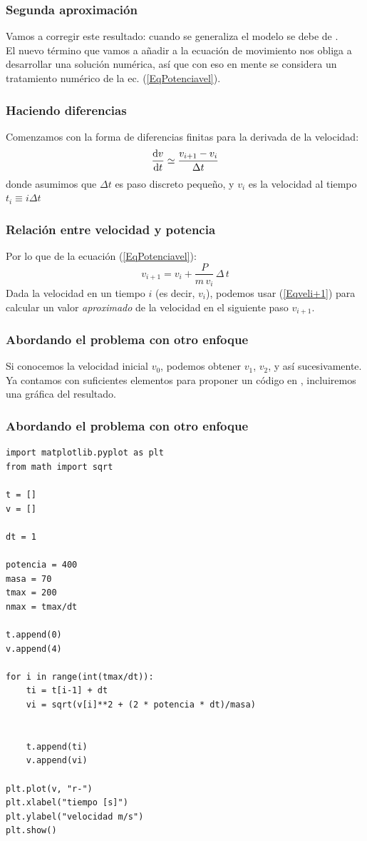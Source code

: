 \documentclass[12pt]{beamer}
\begin{document}
\begin{frame}
\frametitle{Segunda aproximación}
Vamos a corregir este resultado: cuando se generaliza el modelo se debe de .
\\
\bigskip
\pause
El nuevo término que vamos a añadir a la ecuación de movimiento nos obliga a desarrollar una solución numérica, así que con eso en mente se considera un tratamiento numérico de la ec. (\ref{EqPotenciavel}).
\end{frame}
\begin{frame}
\frametitle{Haciendo diferencias}
Comenzamos con la forma de diferencias finitas para la derivada de la velocidad:
\pause
\begin{equation}
\dv{v}{t} \simeq \dfrac{v_{i + 1} - v_{i}}{\Delta t}
\label{Eqderivada}
\end{equation}
donde asumimos que $\Delta t$ es paso discreto pequeño, y $v_{i}$ es la velocidad al tiempo $t_{i} \equiv i \Delta t$
\end{frame}
\begin{frame}
\frametitle{Relación entre velocidad y potencia}
Por lo que de la ecuación (\ref{EqPotenciavel}):
\pause
\begin{equation}
v_{i + 1} = v_{i} + \dfrac{P}{m \, v_{i}} \, \Delta \, t
\label{Eqveli+1}
\end{equation}
Dada la velocidad en un tiempo $i$ (es decir, $v_{i}$), podemos usar (\ref{Eqveli+1}) para calcular un valor \textit{aproximado} de la velocidad en el siguiente paso $v_{i+1}$.
\end{frame}
\begin{frame}
\frametitle{Abordando el problema con otro enfoque}
Si conocemos la velocidad inicial $v_{0}$, podemos obtener $v_{1}$, $v_{2}$, y así sucesivamente.
\\
\bigskip
\pause
Ya contamos con suficientes elementos para proponer un código en \python{}, incluiremos una gráfica del resultado.
\end{frame}
\begin{frame}
\frametitle{Abordando el problema con otro enfoque}
\begin{lstlisting}[basicstyle=\linespread{1.2}\ttfamily\small, columns=fullflexible,escapeinside=||]
import matplotlib.pyplot as plt
from math import sqrt

t = []
v = []

dt = 1

potencia = 400
masa = 70
tmax = 200
nmax = tmax/dt

t.append(0)
v.append(4)

for i in range(int(tmax/dt)):
    ti = t[i-1] + dt
    vi = sqrt(v[i]**2 + (2 * potencia * dt)/masa)
    
    
    t.append(ti)
    v.append(vi)

plt.plot(v, "r-")
plt.xlabel("tiempo [s]")
plt.ylabel("velocidad m/s")
plt.show()
\end{lstlisting}
\end{frame}
\end{document}
